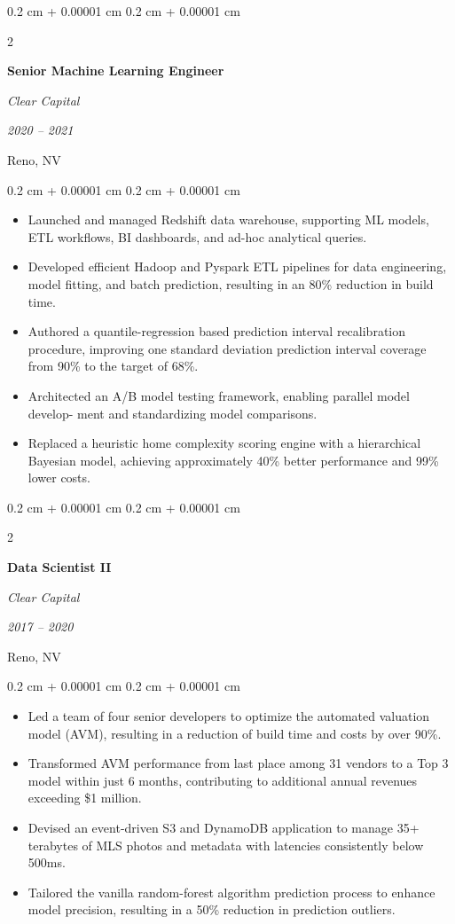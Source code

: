 \documentclass[11pt, letterpaper]{article}
\newenvironment{highlights}{
    \begin{itemize}[
        topsep=0.10 cm,
        parsep=0.10 cm,
        partopsep=0pt,
        itemsep=0pt,
        leftmargin=0.4 cm + 10pt
    ]
}{
    \end{itemize}
} %
\newenvironment{onecolentry}{
    \begin{adjustwidth}{
        0.2 cm + 0.00001 cm
    }{
        0.2 cm + 0.00001 cm
    }
}{
    \end{adjustwidth}
} %
\newenvironment{twocolentry}[2][]{
    \onecolentry
    \def\secondColumn{#2}
    \setcolumnwidth{\fill, 4.5 cm}
    \begin{paracol}{2}
}{
    \switchcolumn \raggedleft \secondColumn
    \end{paracol}
    \endonecolentry
} %
\begin{document}
\pagebreak
\begin{twocolentry}{
    \textit{2020 – 2021} 

    Reno, NV
    }
    \textbf{Senior Machine Learning Engineer}

    \textit{Clear Capital}
\end{twocolentry}

\begin{onecolentry}
    \begin{highlights}

\item Launched and managed Redshift data warehouse, supporting ML models, ETL
workﬂows, BI dashboards, and ad-hoc analytical queries.
\item Developed eﬃcient Hadoop and Pyspark ETL pipelines for data engineering,
model ﬁtting, and batch prediction, resulting in an 80\% reduction in build time.
\item Authored a quantile-regression based prediction interval recalibration procedure, improving 
one standard deviation prediction interval coverage from 90\% to the target of 68\%.
\item Architected an A/B model testing framework, enabling parallel model develop-
ment and standardizing model comparisons.
\item Replaced a heuristic home complexity scoring engine with a hierarchical Bayesian model,
achieving approximately 40\% better performance and 99\% lower costs.
        
    \end{highlights}
\end{onecolentry}

\vspace{0.2 cm}
\begin{twocolentry}{
    \textit{2017 – 2020} 

    Reno, NV
    }
    \textbf{Data Scientist II}

    \textit{Clear Capital}
\end{twocolentry}

\begin{onecolentry}
    \begin{highlights}

        \item Led a team of four senior developers to optimize the automated valuation
        model (AVM), resulting in a reduction of build time and costs by over 90\%.
        \item  Transformed AVM performance from last place among 31 vendors to a Top
        3 model within just 6 months, contributing to additional annual revenues
        exceeding \$1 million.
        \item Devised an event-driven S3 and DynamoDB application to manage 35+ terabytes 
        of MLS photos and metadata with latencies consistently below 500ms.
        \item Tailored the vanilla random-forest algorithm prediction process to enhance model
        precision, resulting in a 50\% reduction in prediction outliers.
        
    \end{highlights}
\end{onecolentry}
\end{document}
